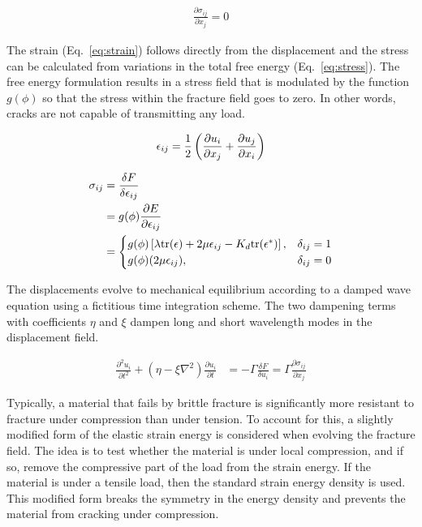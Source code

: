 \begin{align} \label{eq:mechanical_equilibrium}
	\frac{\partial \sigma_{ij}}{\partial x_j} = 0
\end{align}

The strain (Eq.~\ref{eq:strain}) follows directly from the displacement and the stress can be calculated from variations in the total free energy (Eq.~\ref{eq:stress}). The free energy formulation results in a stress field that is modulated by the function $g(\phi)$ so that the stress within the fracture field goes to zero. In other words, cracks are not capable of transmitting any load.

\begin{align} \label{eq:strain}
\epsilon_{ij} = \frac{1}{2}\left( \frac{\partial u_i}{\partial x_j} + \frac{\partial u_j}{\partial x_i}\right) 
\end{align}

\begin{align}
\sigma_{ij} &= \frac{\delta F}{\delta \epsilon_{ij}} \notag\\
&= g(\phi)\frac{\partial E}{\partial \epsilon_{ij}}\label{eq:stress}\\
 &= 
\begin{cases}
g(\phi)\left[\lambda\text{tr}(\epsilon) + 2\mu \epsilon_{ij} - K_d\text{tr}(\epsilon^*)\right], &\delta_{ij}=1 \\
g(\phi)(2\mu\epsilon_{ij}), & \delta_{ij}=0	\notag
\end{cases}	
\end{align}

The displacements evolve to mechanical equilibrium according to a damped wave equation using a fictitious time integration scheme. The two dampening terms with coefficients $\eta$ and $\xi$ dampen long and short wavelength modes in the displacement field. 

\begin{align}
\frac{\partial^2 u_i}{\partial t^2} + (\eta - \xi \nabla^2) \frac{\partial u_i}{\partial t} &= - \Gamma \frac{\delta F}{\delta u_i} = \Gamma \frac{\partial \sigma_{ij}}{\partial x_j}
\end{align}

Typically, a material that fails by brittle fracture is significantly more resistant to fracture under compression than under tension. To account for this, a slightly modified form of the elastic strain energy is considered when evolving the fracture field. The idea is to test whether the material is under local compression, and if so, remove the compressive part of the load from the strain energy. If the material is under a tensile load, then the standard strain energy density is used. This modified form breaks the symmetry in the energy density and prevents the material from cracking under compression. 

